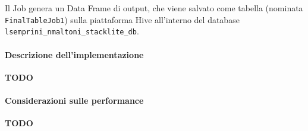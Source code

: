   Il Job genera un Data Frame di output, che viene salvato come tabella (nominata \texttt{FinalTableJob1})
  sulla piattaforma Hive all'interno del database \texttt{lsemprini_nmaltoni_stacklite_db}.

  \paragraph{Descrizione dell'implementazione}\label{par:job1:spark:implementation}

  \textbf{TODO}

  \paragraph{Considerazioni sulle performance}\label{par:job1:spark:performance}

  \textbf{TODO}
